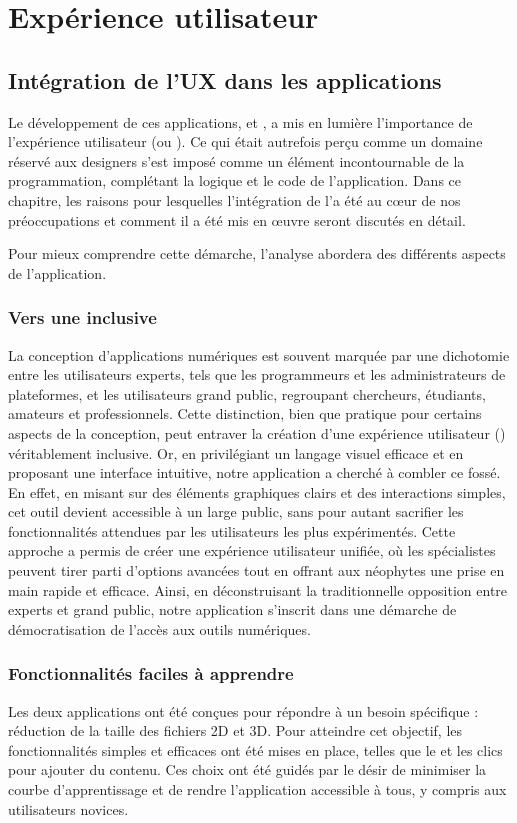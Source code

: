 \chapter{Expérience utilisateur}
    \section{Intégration de l'UX dans les applications}
    
    Le développement de ces applications, \cvt et \msh, a mis en lumière l'importance de l'expérience utilisateur (\ux ou ). Ce qui était autrefois perçu comme un domaine réservé aux designers s'est imposé comme un élément incontournable de la programmation, complétant la logique et le code de l'application. Dans ce chapitre, les raisons pour lesquelles l'intégration de l'\ux a été au cœur de nos préoccupations et comment il a été mis en œuvre seront discutés en détail.

    Pour mieux comprendre cette démarche, l'analyse abordera des différents aspects de l'application.

        \subsection{Vers une \ux inclusive}
        La conception d'applications numériques est souvent marquée par une dichotomie entre les utilisateurs experts, tels que les programmeurs et les administrateurs de plateformes, et les utilisateurs grand public, regroupant chercheurs, étudiants, amateurs et professionnels. Cette distinction, bien que pratique pour certains aspects de la conception, peut entraver la création d'une expérience utilisateur (\ux) véritablement inclusive. Or, en privilégiant un langage visuel efficace et en proposant une interface intuitive, notre application a cherché à combler ce fossé. En effet, en misant sur des éléments graphiques clairs et des interactions simples,  cet outil devient accessible à un large public, sans pour autant sacrifier les fonctionnalités attendues par les utilisateurs les plus expérimentés. Cette approche a permis de créer une expérience utilisateur unifiée, où les spécialistes peuvent tirer parti d'options avancées tout en offrant aux néophytes une prise en main rapide et efficace. Ainsi, en déconstruisant la traditionnelle opposition entre experts et grand public, notre application s'inscrit dans une démarche de démocratisation de l'accès aux outils numériques.

        \subsection{Fonctionnalités faciles à apprendre}
        Les deux applications ont été conçues pour répondre à un besoin spécifique : réduction de la taille des fichiers 2D et 3D. Pour atteindre cet objectif, les fonctionnalités simples et efficaces ont été mises en place, telles que le  et les clics pour ajouter du contenu. Ces choix ont été guidés par le désir de minimiser la courbe d'apprentissage et de rendre l'application accessible à tous, y compris aux utilisateurs novices.

